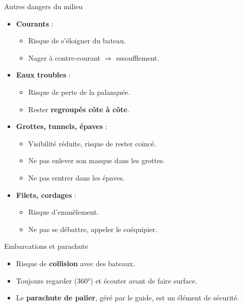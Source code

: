 \begin{frame}{Autres dangers du milieu}
  \begin{itemize}
    \item \textbf{Courants} :
          \begin{itemize}
            \item Risque de s'éloigner du bateau.
            \item Nager à contre-courant $\Rightarrow$ essoufflement.
          \end{itemize}
    \item \textbf{Eaux troubles} :
          \begin{itemize}
            \item Risque de perte de la palanquée.
            \item Rester \textbf{regroupés côte à côte}.
          \end{itemize}
    \item \textbf{Grottes, tunnels, épaves} :
          \begin{itemize}
            \item Visibilité réduite, risque de rester coincé.
            \item Ne pas enlever son masque dans les grottes.
            \item Ne pas rentrer dans les épaves.
          \end{itemize}
    \item \textbf{Filets, cordages} :
          \begin{itemize}
            \item Risque d'emmêlement.
            \item Ne pas se débattre, appeler le coéquipier.
          \end{itemize}
  \end{itemize}
\end{frame}

\begin{frame}{Embarcations et parachute}
  \begin{itemize}
    \item Risque de \textbf{collision} avec des bateaux.
    \item Toujours regarder (360°) et écouter avant de faire surface.
    \item Le \textbf{parachute de palier}, géré par le guide, est un élément de sécurité.
  \end{itemize}
\end{frame}

